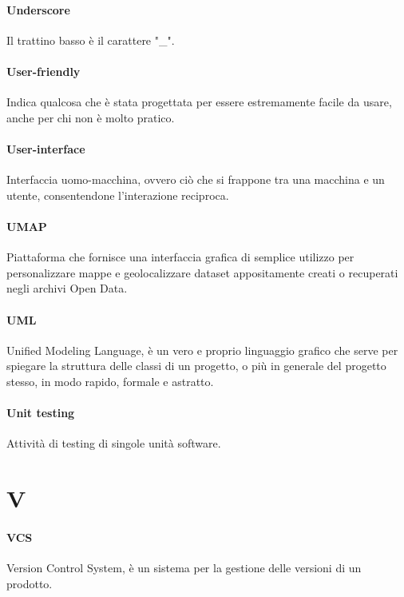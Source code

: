\documentclass[]{article}
\begin{document}
	\paragraph*{Underscore}
	Il trattino basso è il carattere "\_".

	\paragraph*{User-friendly}
	Indica qualcosa che è stata progettata per essere estremamente facile da usare, anche per chi non è molto pratico.

	\paragraph*{User-interface}
	Interfaccia uomo-macchina, ovvero ciò che si frappone tra una macchina e un utente, consentendone l'interazione reciproca.

	\paragraph*{UMAP}
	Piattaforma che fornisce una interfaccia grafica di semplice utilizzo per personalizzare mappe e geolocalizzare dataset appositamente creati o recuperati negli archivi Open Data.

	\paragraph*{UML}
	Unified Modeling Language, è un vero e proprio linguaggio grafico che serve per spiegare la struttura delle classi di un progetto, o più in generale del progetto stesso, in modo rapido, formale e astratto.

	\paragraph*{Unit testing}
	Attività di testing di singole unità software.

	\newpage

	\section*{V}

	\paragraph*{VCS}
	Version Control System, è un sistema per la gestione delle versioni di un prodotto.
\end{document}
